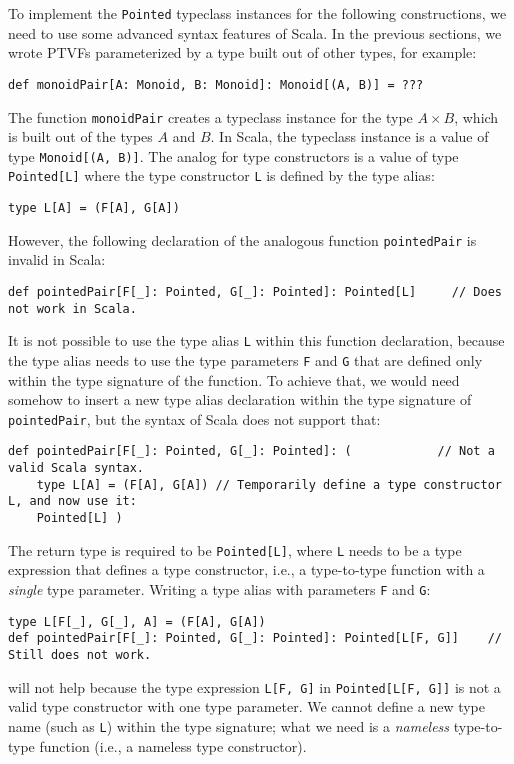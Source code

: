 To implement the \lstinline!Pointed! typeclass instances for the
following constructions, we need to use some advanced syntax features
of Scala. In the previous sections, we wrote PTVFs parameterized by
a type built out of other types, for example:
\begin{lstlisting}
def monoidPair[A: Monoid, B: Monoid]: Monoid[(A, B)] = ???
\end{lstlisting}
The function \lstinline!monoidPair! creates a typeclass instance
for the type $A\times B$, which is built out of the types $A$ and
$B$. In Scala, the typeclass instance is a value of type \lstinline!Monoid[(A, B)]!.
The analog for type constructors is a value of type \lstinline!Pointed[L]!
where the type constructor \lstinline!L! is defined by the type alias:
\begin{lstlisting}
type L[A] = (F[A], G[A])
\end{lstlisting}
However, the following declaration of the analogous function \lstinline!pointedPair!
is invalid in Scala:
\begin{lstlisting}
def pointedPair[F[_]: Pointed, G[_]: Pointed]: Pointed[L]     // Does not work in Scala.
\end{lstlisting}
It is not possible to use the type alias \lstinline!L! within this
function declaration, because the type alias needs to use the type
parameters \lstinline!F! and \lstinline!G! that are defined only
within the type signature of the function. To achieve that, we would
need somehow to insert a new type alias declaration within the type
signature of \lstinline!pointedPair!, but the syntax of Scala does
not support that:
\begin{lstlisting}
def pointedPair[F[_]: Pointed, G[_]: Pointed]: (            // Not a valid Scala syntax.
    type L[A] = (F[A], G[A]) // Temporarily define a type constructor L, and now use it:
    Pointed[L] )
\end{lstlisting}
The return type is required to be \lstinline!Pointed[L]!, where \lstinline!L!
needs to be a type expression that defines a type constructor, i.e.,
a type-to-type function with a \emph{single} type parameter. Writing
a type alias with parameters \lstinline!F! and \lstinline!G!:
\begin{lstlisting}
type L[F[_], G[_], A] = (F[A], G[A])
def pointedPair[F[_]: Pointed, G[_]: Pointed]: Pointed[L[F, G]]    // Still does not work.
\end{lstlisting}
will not help because the type expression \lstinline!L[F, G]! in
\lstinline!Pointed[L[F, G]]! is not a valid type constructor with
one type parameter. We cannot define a new type name (such as \lstinline!L!)
within the type signature; what we need is a \emph{nameless} type-to-type
function (i.e., a nameless type constructor).

